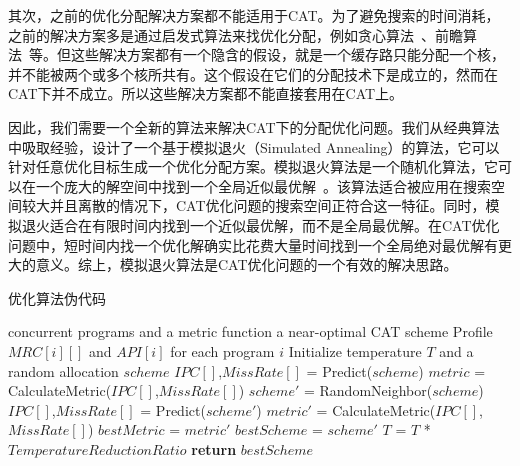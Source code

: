 其次，之前的优化分配解决方案都不能适用于CAT。为了避免搜索的时间消耗，之前的解决方案多是通过启发式算法来找优化分配，例如贪心算法~\parencite{suh2004dynamic}、前瞻算法~\parencite{qureshi2006utility}等。但这些解决方案都有一个隐含的假设，就是一个缓存路只能分配一个核，并不能被两个或多个核所共有。这个假设在它们的分配技术下是成立的，然而在CAT下并不成立。所以这些解决方案都不能直接套用在CAT上。

因此，我们需要一个全新的算法来解决CAT下的分配优化问题。我们从经典算法中吸取经验，设计了一个基于模拟退火（Simulated Annealing）的算法，它可以针对任意优化目标生成一个优化分配方案。模拟退火算法是一个随机化算法，它可以在一个庞大的解空间中找到一个全局近似最优解~\parencite{aarts1988simulated,hwang1988simulated}。该算法适合被应用在搜索空间较大并且离散的情况下，CAT优化问题的搜索空间正符合这一特征。同时，模拟退火适合在有限时间内找到一个近似最优解，而不是全局最优解。在CAT优化问题中，短时间内找一个优化解确实比花费大量时间找到一个全局绝对最优解有更大的意义。综上，模拟退火算法是CAT优化问题的一个有效的解决思路。

\begin{algorithm}
\caption{优化算法伪代码}
\label{alg:opt}
\begin{algorithmic}[1]
\renewcommand{\algorithmicforall}{\textbf{foreach}}
\renewcommand{\algorithmicrequire}{\textbf{Input:}}
\renewcommand{\algorithmicensure}{\textbf{Output:}}
\REQUIRE concurrent programs and a metric function
\ENSURE a near-optimal CAT scheme
\STATE Profile $MRC[i][]$ and $API[i]$ for each program $i$
\STATE Initialize temperature $T$ and a random allocation $scheme$
\STATE $IPC[]$,$MissRate[]$ = Predict($scheme$)
\STATE $metric$ = CalculateMetric($IPC[]$,$MissRate[]$)
	\STATE $scheme'$ = RandomNeighbor($scheme$)
    \STATE $IPC[]$,$MissRate[]$ = Predict($scheme'$)
    \STATE $metric'$ = CalculateMetric($IPC[]$,$MissRate[]$)
    	\STATE $bestMetric$ = $metric'$ 
        \STATE $bestScheme$ = $scheme'$
    \ENDIF
    \ELSE
    \ENDIF
    \ENDIF
    \STATE $T$ = $T$ * $TemperatureReductionRatio$
\ENDWHILE
\STATE \textbf{return} $bestScheme$

\end{algorithmic}
\end{algorithm}

